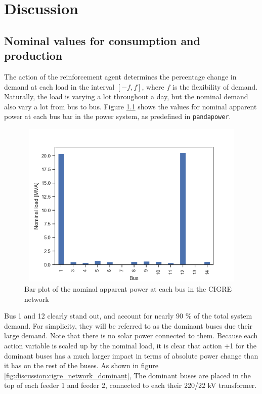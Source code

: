 \documentclass[class=book, crop=false]{standalone}
\begin{document}
\chapter{Discussion}
\section{Nominal values for consumption and production}
The action of the reinforcement agent determines the percentage change in demand at each load in the interval $[-f,f]$, where $f$ is the flexibility of demand. Naturally, the load is varying a lot throughout a day, but the nominal demand also vary a lot from bus to bus. Figure \ref{fig:discussion:nominal_load} shows the values for nominal apparent power at each bus bar in the power system, as predefined in \texttt{pandapower}.

\begin{figure}[ht]
    \center
\includegraphics[height=8cm, width=12cm]{figures/nominal_load.png}
    \caption[size = 9]{Bar plot of the nominal apparent power at each bus in the CIGRE network}
    \label{fig:discussion:nominal_load}
\end{figure}

Bus 1 and 12 clearly stand out, and account for nearly 90 \% of the total system demand. For simplicity, they will be referred to as the dominant buses due their large demand. Note that there is no solar power connected to them. Because each action variable is scaled up by the nominal load, it is clear that action +1 for the dominant buses has a much larger impact in terms of absolute power change than it has on the rest of the buses. As shown in figure \ref{fig:discussion:cigre_network_dominant}, The dominant buses are placed in the top of each feeder 1 and feeder 2, connected to each their 220/22 kV transformer. 
\end{document}
